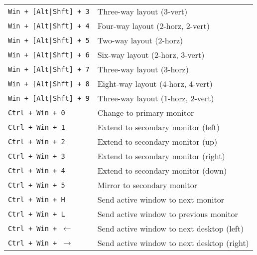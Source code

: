 \documentclass[letterpaper,12pt]{article}
\begin{document}
\begin{table}[H]
\begin{tabular}{|C{5cm}|L{10cm}|}
    {\tt Win + [Alt|Shft] + 3} & Three-way layout (3-vert) \\
    {\tt Win + [Alt|Shft] + 4} & Four-way layout (2-horz, 2-vert) \\
    {\tt Win + [Alt|Shft] + 5} & Two-way layout (2-horz) \\
    {\tt Win + [Alt|Shft] + 6} & Six-way layout (2-horz, 3-vert) \\
    {\tt Win + [Alt|Shft] + 7} & Three-way layout (3-horz) \\
    {\tt Win + [Alt|Shft] + 8} & Eight-way layout (4-horz, 4-vert) \\
    {\tt Win + [Alt|Shft] + 9} & Three-way layout (1-horz, 2-vert) \\
    \hline
    {\tt Ctrl + Win + 0} & Change to primary monitor \\
    {\tt Ctrl + Win + 1} & Extend to secondary monitor (left) \\
    {\tt Ctrl + Win + 2} & Extend to secondary monitor (up) \\
    {\tt Ctrl + Win + 3} & Extend to secondary monitor (right) \\
    {\tt Ctrl + Win + 4} & Extend to secondary monitor (down) \\
    {\tt Ctrl + Win + 5} & Mirror to secondary monitor \\
    {\tt Ctrl + Win + H} & Send active window to next monitor \\
    {\tt Ctrl + Win + L} & Send active window to previous monitor \\
    {\tt Ctrl + Win + $\leftarrow$} & Send active window to next desktop (left) \\
    {\tt Ctrl + Win + $\rightarrow$} & Send active window to next desktop (right) \\
    \hline
  \end{tabular}
\end{table}
\end{document}
